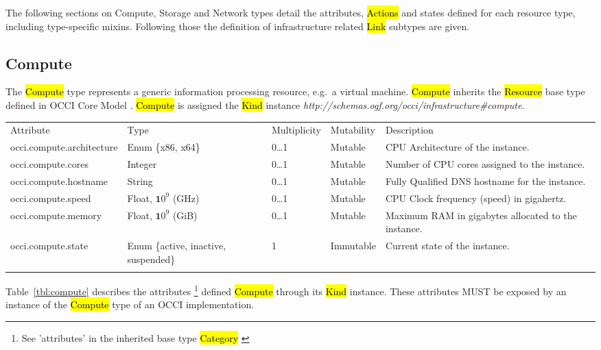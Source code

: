 \documentclass[10pt,a4paper]{article}
\begin{document}
The following sections on Compute, Storage and Network types detail the attributes, 
\hl{Actions} and states defined for each resource type, including type-specific mixins. 
Following those the definition of infrastructure related \hl{Link} subtypes are given.

\subsection{Compute}
The \hl{Compute} type represents a generic information processing resource, e.g.~a
virtual machine. \hl{Compute} inherits the \hl{Resource} base type defined in
OCCI Core Model \cite{occi:core}.
\hl{Compute} is assigned the \hl{Kind} instance
\textit{http://schemas.ogf.org/occi/infrastructure\#compute}.

	{
		\begin{tabular}{lp{2.5cm}p{1cm}lp{6cm}}
		\toprule
		Attribute&Type&Multi\-plicity&Mutability&Description\\
		\colrule
		occi.compute.architecture & Enum \{x86, x64\} & 0\ldots1 
		& Mutable & CPU Architecture of the instance.\\
		occi.compute.cores & Integer & 0\ldots1 & Mutable 
		& Number of CPU cores assigned to the instance.\\
		occi.compute.hostname & String & 0\ldots1 
		& Mutable & Fully Qualified DNS hostname for the instance.\\
		occi.compute.speed & Float, ${\mathbf 10}^9$ (GHz) & 0\ldots1 
		& Mutable & CPU Clock frequency (speed) in gigahertz.\\
		occi.compute.memory & Float, ${\mathbf 10}^9$ (GiB) & 0\ldots1 
		& Mutable & Maximum RAM in gigabytes allocated to the instance.\\
		occi.compute.state & Enum \{active, inactive, suspended\} & 1 
		& Immutable & Current state of the instance.\\
		\botrule
		\end{tabular}
	}

Table~\ref{tbl:compute} describes the attributes \footnote{See ’attributes’ in the inherited 
base type \hl{Category}  \cite{occi:core}} 
defined \hl{Compute} through its \hl{Kind} instance. These attributes
MUST be exposed by an instance of the \hl{Compute} type of an OCCI implementation.
\end{document}
